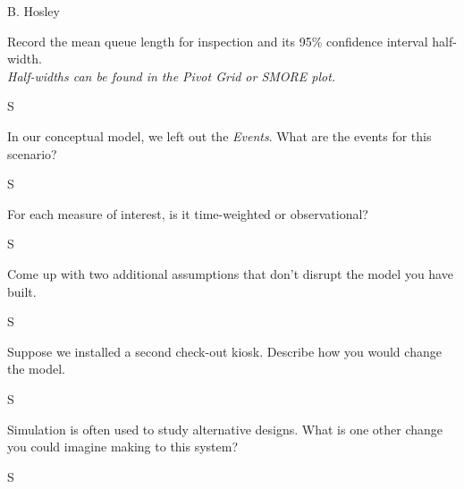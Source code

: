 \documentclass[answers]{exam}
\begin{document}
\hspace{\fill} {\large B. Hosley}
\bigskip

\begin{questions}

\question 
Record the mean queue length for inspection and its 95\% confidence interval half-width. \\
\hspace{3em} \textit{Half-widths can be found in the Pivot Grid or SMORE plot.}
\begin{solution}
	S
\end{solution}

\question 
In our conceptual model, we left out the \textit{Events}. What are the events for this scenario?
\begin{solution}
	S
\end{solution}

\question 
For each measure of interest, is it time-weighted or observational?
\begin{solution}
	S
\end{solution}

\question 
Come up with two additional assumptions that don’t disrupt the model you have built.
\begin{solution}
	S
\end{solution}

\question 
Suppose we installed a second check-out kiosk. Describe how you would change  the model.
\begin{solution}
	S
\end{solution}

\question 
Simulation is often used to study alternative designs. What is one other change  you could imagine making to this system?
\begin{solution}
	S
\end{solution}

\end{questions}
\end{document}
